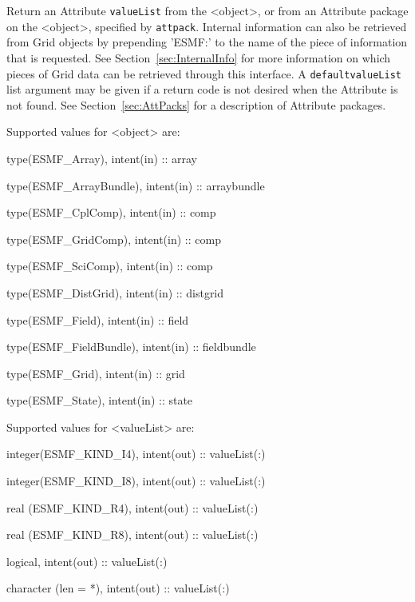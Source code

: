   Return an Attribute {\tt valueList} from the <object>, or from an
   Attribute package on the <object>, specified by {\tt attpack}. Internal
   information can also be retrieved from Grid objects by prepending 'ESMF:'
   to the name of the piece of information that is requested. See
   Section~\ref{sec:InternalInfo} for more information
   on which pieces of Grid data can be retrieved through this interface.
   A {\tt defaultvalueList} list argument may be given if
   a return code is not desired when the Attribute is not found.
   See Section~\ref{sec:AttPacks} for a description of Attribute packages.
  
   Supported values for <object> are:
   \begin{description}
   \item type(ESMF\_Array), intent(in) :: array
   \item type(ESMF\_ArrayBundle), intent(in) :: arraybundle
   \item type(ESMF\_CplComp), intent(in) :: comp
   \item type(ESMF\_GridComp), intent(in) :: comp
   \item type(ESMF\_SciComp), intent(in) :: comp
   \item type(ESMF\_DistGrid), intent(in) :: distgrid
   \item type(ESMF\_Field), intent(in) :: field
   \item type(ESMF\_FieldBundle), intent(in) :: fieldbundle
   \item type(ESMF\_Grid), intent(in) :: grid
   \item type(ESMF\_State), intent(in) :: state
   \end{description}
  
   Supported values for <valueList> are:
   \begin{description}
   \item integer(ESMF\_KIND\_I4), intent(out) :: valueList(:)
   \item integer(ESMF\_KIND\_I8), intent(out) :: valueList(:)
   \item real (ESMF\_KIND\_R4), intent(out) :: valueList(:)
   \item real (ESMF\_KIND\_R8), intent(out) :: valueList(:)
   \item logical, intent(out) :: valueList(:)
   \item character (len = *), intent(out) :: valueList(:)
   \end{description}
  
